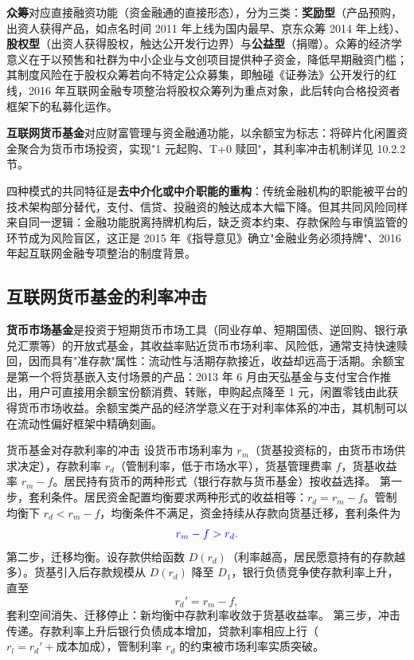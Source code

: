 \textbf{众筹}对应直接融资功能（资金融通的直接形态），分为三类：\textbf{奖励型}（产品预购，出资人获得产品，如点名时间 2011 年上线为国内最早、京东众筹 2014 年上线）、\textbf{股权型}（出资人获得股权，触达公开发行边界）与\textbf{公益型}（捐赠）。众筹的经济学意义在于以预售和社群为中小企业与文创项目提供种子资金，降低早期融资门槛；其制度风险在于股权众筹若向不特定公众募集，即触碰《证券法》公开发行的红线，2016 年互联网金融专项整治将股权众筹列为重点对象，此后转向合格投资者框架下的私募化运作。

\textbf{互联网货币基金}对应财富管理与资金融通功能，以余额宝为标志：将碎片化闲置资金聚合为货币市场投资，实现"1 元起购、T+0 赎回"，其利率冲击机制详见 10.2.2 节。

四种模式的共同特征是\textbf{去中介化或中介职能的重构}：传统金融机构的职能被平台的技术架构部分替代，支付、信贷、投融资的触达成本大幅下降。但其共同风险同样来自同一逻辑：金融功能脱离持牌机构后，缺乏资本约束、存款保险与审慎监管的环节成为风险盲区，这正是 2015 年《指导意见》确立"金融业务必须持牌"、2016 年起互联网金融专项整治的制度背景。

\subsection{互联网货币基金的利率冲击}

\textbf{货币市场基金}是投资于短期货币市场工具（同业存单、短期国债、逆回购、银行承兑汇票等）的开放式基金，其收益率贴近货币市场利率、风险低，通常支持快速赎回，因而具有"准存款"属性：流动性与活期存款接近，收益却远高于活期。余额宝是第一个将货基嵌入支付场景的产品：2013 年 6 月由天弘基金与支付宝合作推出，用户可直接用余额宝份额消费、转账，申购起点降至 1 元，闲置零钱由此获得货币市场收益。余额宝类产品的经济学意义在于对利率体系的冲击，其机制可以在流动性偏好框架中精确刻画。

\begin{derivation}{货币基金对存款利率的冲击}{}
设货币市场利率为 $r_m$（货基投资标的，由货币市场供求决定），存款利率 $r_d$（管制利率，低于市场水平），货基管理费率 $f$，货基收益率 $r_m - f$。居民持有货币的两种形式（银行存款与货币基金）按收益选择。
第一步，套利条件。居民资金配置均衡要求两种形式的收益相等：$r_d = r_m - f$。管制均衡下 $r_d < r_m - f$，均衡条件不满足，资金持续从存款向货基迁移，套利条件为
\[
\color{blue} r_m - f > r_d.
\]
第二步，迁移均衡。设存款供给函数 $D(r_d)$（利率越高，居民愿意持有的存款越多）。货基引入后存款规模从 $D(r_d)$ 降至 $D_1$，银行负债竞争使存款利率上升，直至
\[
r_d' = r_m - f,
\]
套利空间消失、迁移停止：新均衡中存款利率收敛于货基收益率。
第三步，冲击传递。存款利率上升后银行负债成本增加，贷款利率相应上行（$r_l = r_d' + \text{成本加成}$），管制利率 $r_d$ 的约束被市场利率实质突破。
\end{derivation}

